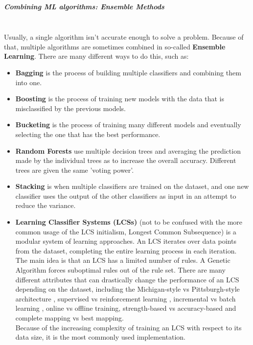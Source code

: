 \subparagraph{Combining ML algorithms: Ensemble Methods}\mbox{}\\
Usually, a single algorithm isn't accurate enough to solve a problem. Because of that, multiple algorithms are sometimes combined in so-called \textbf{Ensemble Learning}. There are many different ways to do this, such as:\cite{fernandez2014we}
\begin{itemize}
	\item \textbf{Bagging}
		is the process of building multiple classifiers and combining them into one.
	\item \textbf{Boosting}
		is the process of training new models with the data that is misclassified by the previous models.
	\item \textbf{Bucketing}
		is the process of training many different models and eventually selecting the one that has the best performance.
	\item \textbf{Random Forests}\cite{Breiman2001}
		use multiple decision trees and averaging the prediction made by the individual trees as to increase the overall accuracy. Different trees are given the same 'voting power'.
	\item \textbf{Stacking}
		is when multiple classifiers are trained on the dataset, and one new classifier uses the output of the other classifiers as input in an attempt to reduce the variance.
	\item \textbf{Learning Classifier Systems (LCSs)}
		(not to be confused with the more common usage of the LCS initialism, Longest Common Subsequence) is a modular system of learning approaches. An LCS iterates over data points from the dataset, completing the entire learning process in each iteration. The main idea is that an LCS has a limited number of rules. A Genetic Algorithm forces suboptimal rules out of the rule set. There are many different attributes that can drastically change the performance of an LCS depending on the dataset, including the Michigan-style vs Pittsburgh-style architecture \cite{Puig09}, supervised vs reinforcement learning \cite{kaelbling1996reinforcement}, incremental vs batch learning \cite{clearwater1989incremental}, online vs offline training, strength-based vs accuracy-based \cite{wilson1995classifier} and complete mapping vs best mapping.\\		
		Because of the increasing complexity of training an LCS with respect to its data size, it is the most commonly used implementation.
\end{itemize}


%
%



